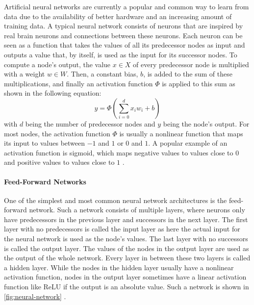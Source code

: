 Artificial neural networks are currently a popular and common way to learn from data due to the availability of better hardware and an increasing amount of training data.
A typical neural network consists of neurons that are inspired by real brain neurons and connections between these neurons.
Each neuron can be seen as a function that takes the values of all its predecessor nodes as input and outputs a value that, by itself, is used as the input for its successor nodes.
To compute a node's output, the value $x \in X$ of every predecessor node is multiplied with a weight $w \in W$.
Then, a constant bias, $b$, is added to the sum of these multiplications, and finally an activation function $\Phi$ is applied to this sum as shown in the following equation:
\[
	y = \Phi(\sum_{i=0}^{d}x_iw_i + b)
\]
with $d$ being the number of predecessor nodes and $y$ being the node's output.
For most nodes, the activation function $\Phi$ is usually a nonlinear function that maps its input to values between $-1$ and $1$ or $0$ and $1$.
A popular example of an activation function is sigmoid, which maps negative values to values close to $0$ and positive values to values close to $1$ \cite[p.~4--13]{Aggarwal2018}.

\paragraph{Feed-Forward Networks}

One of the simplest and most common neural network architectures is the feed-forward network.
Such a network consists of multiple layers, where neurons only have predecessors in the previous layer and successors in the next layer.
The first layer with no predecessors is called the input layer as here the actual input for the neural network is used as the node's values.
The last layer with no successors is called the output layer.
The values of the nodes in the output layer are used as the output of the whole network.
Every layer in between these two layers is called a hidden layer.
While the nodes in the hidden layer usually have a nonlinear activation function, nodes in the output layer sometimes have a linear activation function like ReLU if the output is an absolute value. 
Such a network is shown in \cref{fig:neural-network} \cite[p.~17--20]{Aggarwal2018}.

